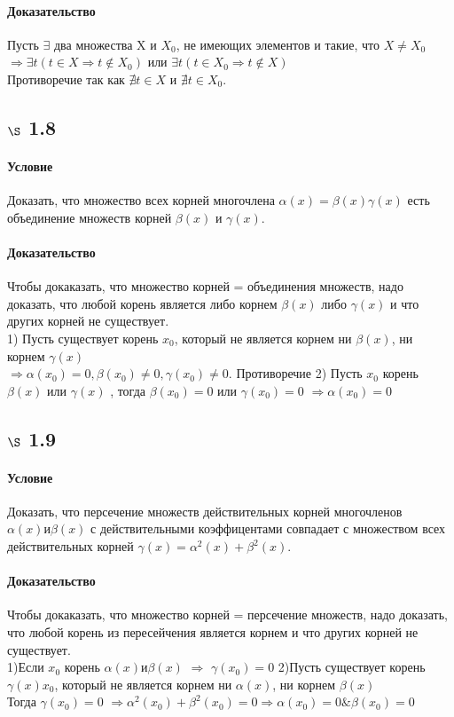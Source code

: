 \documentclass[a4paper,12pt]{article}
\begin{document}
\paragraph*{Доказательство}
Пусть $\exists$ два множества X и $X_0$, не имеющих элементов и такие, что $X \not= X_0$\\
$ \Rightarrow \exists t ( t \in X \Rightarrow  t \not\in X_0 )$ или $\exists t ( t \in X_0 \Rightarrow  t \not\in X )$ \\
Противоречие так как $\nexists t \in X$ и $\nexists t \in X_0$.

\subsection*{$\S$ 1.8}
\paragraph*{Условие}
Доказать, что множество всех корней многочлена $\alpha (x)=\beta (x) \gamma (x)$ есть объединение множеств корней $\beta (x)$ и $\gamma(x)$.
\paragraph*{Доказательство}
Чтобы докаказать, что множество корней = объединения множеств, надо доказать, что любой корень является либо корнем $\beta (x)$ либо $\gamma(x)$ и что других корней не существует.\\
1) Пусть существует корень $x_0$, который не является корнем ни $\beta (x)$, ни корнем $\gamma(x)$ \\
$\Rightarrow \alpha (x_0) = 0, \beta (x_0) \not= 0,  \gamma (x_0) \not= 0$. Противоречие
2) Пусть $x_0$ корень $\beta (x)$ или  $\gamma(x)$ , тогда  $\beta (x_0) = 0$ или $\gamma(x_0) = 0$ $\Rightarrow \alpha(x_0) = 0$

\subsection*{$\S$ 1.9}
\paragraph*{Условие}
Доказать, что персечение множеств действительных корней многочленов  $\alpha (x) и \beta (x)$ с действительными коэффицентами  совпадает с множеством всех действительных корней $\gamma(x) =\alpha^2 (x) + \beta^2 (x)  $.
\paragraph*{Доказательство}
Чтобы докаказать, что множество корней = персечение множеств, надо доказать, что любой корень из пересейчения является корнем и что других корней не существует.\\
1)Если $x_0$ корень $\alpha (x) и \beta (x)$ $\Rightarrow$ $\gamma(x_0) = 0$
2)Пусть существует корень  $\gamma(x) x_0$, который не является корнем ни $\alpha (x)$, ни корнем $\beta(x)$ \\
Тогда $\gamma(x_0) = 0$ $\Rightarrow \alpha^2 (x_0) + \beta^2 (x_0) = 0 \Rightarrow  \alpha(x_0) =  0 \& \beta (x_0) = 0$
\end{document}
